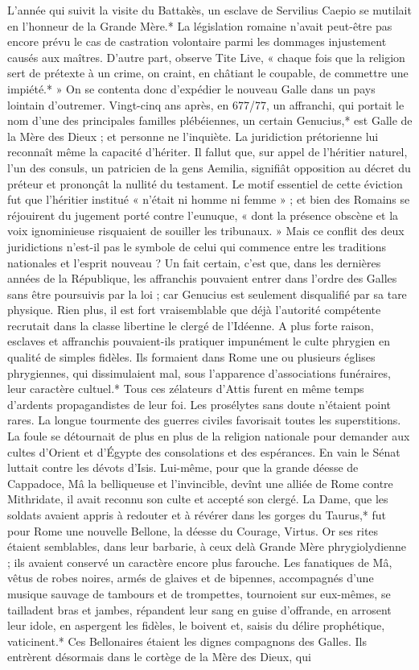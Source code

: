 \documentclass[a4paper, 11pt, oneside, polutonikogreek, french]{article}
\begin{document}
L'année qui suivit la visite du Battakès, un esclave de Servilius Caepio se mutilait en l'honneur de la Grande Mère.* La législation romaine n'avait peut-être pas encore prévu le cas de castration volontaire parmi les dommages injustement causés aux maîtres. D'autre part, observe Tite Live, « chaque fois que la religion sert de prétexte à un crime, on craint, en châtiant le coupable, de commettre une impiété.* » On se contenta donc d'expédier le nouveau Galle dans un pays lointain d'outremer. Vingt-cinq ans après, en 677/77, un affranchi, qui portait le nom d'une des principales familles plébéiennes, un certain Genucius,* est Galle de la Mère des Dieux ; et personne ne l'inquiète. La juridiction prétorienne lui reconnaît même la capacité d'hériter. Il fallut que, sur appel de l'héritier naturel, l'un des consuls, un patricien de la gens Aemilia, signifiât opposition au décret du préteur et prononçât la nullité du testament. Le motif essentiel de cette éviction fut que l'héritier institué « n'était ni homme ni femme » ; et bien des Romains se réjouirent du jugement porté contre l'eunuque, « dont la présence obscène et la voix ignominieuse risquaient de souiller les tribunaux. » Mais ce conflit des deux juridictions n'est-il pas le symbole de celui qui commence entre les traditions nationales et l'esprit nouveau ? Un fait certain, c'est que, dans les dernières années de la République, les affranchis pouvaient entrer dans l'ordre des Galles sans être poursuivis par la loi ; car Genucius est seulement disqualifié par sa tare physique. Rien plus, il est fort vraisemblable que déjà l'autorité compétente recrutait dans la classe libertine le clergé de l'Idéenne. A plus forte raison, esclaves et affranchis pouvaient-ils pratiquer impunément le culte phrygien en qualité de simples fidèles. Ils formaient dans Rome une ou plusieurs églises phrygiennes, qui dissimulaient mal, sous l'apparence d'associations funéraires, leur caractère cultuel.* Tous ces zélateurs d'Attis furent en même temps d'ardents propagandistes de leur foi. Les prosélytes sans doute n'étaient point rares. La longue tourmente des guerres civiles favorisait toutes les superstitions. La foule se détournait de plus en plus de la religion nationale pour demander aux cultes d'Orient et d'Égypte des consolations et des espérances. En vain le Sénat luttait contre les dévots d'Isis. Lui-même, pour que la grande déesse de Cappadoce, Mâ la belliqueuse et l'invincible, devînt une alliée de Rome contre Mithridate, il avait reconnu son culte et accepté son clergé. La Dame, que les soldats avaient appris à redouter et à révérer dans les gorges du Taurus,* fut pour Rome une nouvelle Bellone, la déesse du Courage, Virtus. Or ses rites étaient semblables, dans leur barbarie, à ceux delà Grande Mère phrygiolydienne ; ils avaient conservé un caractère encore plus farouche. Les fanatiques de Mâ, vêtus de robes noires, armés de glaives et de bipennes, accompagnés d'une musique sauvage de tambours et de trompettes, tournoient sur eux-mêmes, se tailladent bras et jambes, répandent leur sang en guise d'offrande, en arrosent leur idole, en aspergent les fidèles, le boivent et, saisis du délire prophétique, vaticinent.* Ces Bellonaires étaient les dignes compagnons des Galles. Ils entrèrent désormais dans le cortège de la Mère des Dieux, qui 
\end{document}
